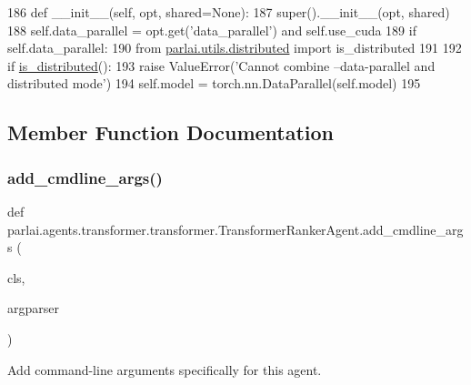 \begin{DoxyCode}
186     \textcolor{keyword}{def }\_\_init\_\_(self, opt, shared=None):
187         super().\_\_init\_\_(opt, shared)
188         self.data\_parallel = opt.get(\textcolor{stringliteral}{'data\_parallel'}) \textcolor{keywordflow}{and} self.use\_cuda
189         \textcolor{keywordflow}{if} self.data\_parallel:
190             \textcolor{keyword}{from} \hyperlink{namespaceparlai_1_1utils_1_1distributed}{parlai.utils.distributed} \textcolor{keyword}{import} is\_distributed
191 
192             \textcolor{keywordflow}{if} \hyperlink{namespaceparlai_1_1utils_1_1distributed_a023acb5e3b66e1f27e21247c35661279}{is\_distributed}():
193                 \textcolor{keywordflow}{raise} ValueError(\textcolor{stringliteral}{'Cannot combine --data-parallel and distributed mode'})
194             self.model = torch.nn.DataParallel(self.model)
195 
\end{DoxyCode}


\subsection{Member Function Documentation}
\mbox{\label{classparlai_1_1agents_1_1transformer_1_1transformer_1_1TransformerRankerAgent_a6836668a4c2394d7217631fed533a7ac}} 
\subsubsection{\texorpdfstring{add\+\_\+cmdline\+\_\+args()}{add\_cmdline\_args()}}
{\footnotesize\ttfamily def parlai.\+agents.\+transformer.\+transformer.\+Transformer\+Ranker\+Agent.\+add\+\_\+cmdline\+\_\+args (\begin{DoxyParamCaption}\item[{}]{cls,  }\item[{}]{argparser }\end{DoxyParamCaption})}

\begin{DoxyVerb}Add command-line arguments specifically for this agent.
\end{DoxyVerb}
 

